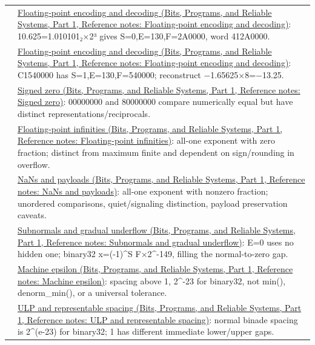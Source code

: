 {\begin{longtable}[]{@{}
  >{\raggedright\arraybackslash}p{}
  >{\raggedright\arraybackslash}p{}@{}}
67 & \href{../01-Bits-Programs-and-Reliable-Systems-P01/main.pdf\#nameddest=appendix-6854d0e2218e}{Floating-point encoding and decoding (Bits, Programs, and Reliable Systems, Part 1, Reference notes: Floating-point encoding and decoding)}: 10.625=1.010101₂×2³ gives S=0,E=130,F=2A0000, word 412A0000. \\
68 & \href{../01-Bits-Programs-and-Reliable-Systems-P01/main.pdf\#nameddest=appendix-6854d0e2218e}{Floating-point encoding and decoding (Bits, Programs, and Reliable Systems, Part 1, Reference notes: Floating-point encoding and decoding)}: C1540000 has S=1,E=130,F=540000; reconstruct −1.65625×8=−13.25. \\
69 & \href{../01-Bits-Programs-and-Reliable-Systems-P01/main.pdf\#nameddest=appendix-3a048f032c1f}{Signed zero (Bits, Programs, and Reliable Systems, Part 1, Reference notes: Signed zero)}: 00000000 and 80000000 compare numerically equal but have distinct representations/reciprocals. \\
70 & \href{../01-Bits-Programs-and-Reliable-Systems-P01/main.pdf\#nameddest=appendix-eb336149c00a}{Floating-point infinities (Bits, Programs, and Reliable Systems, Part 1, Reference notes: Floating-point infinities)}: all-one exponent with zero fraction; distinct from maximum finite and dependent on sign/rounding in overflow. \\
71 & \href{../01-Bits-Programs-and-Reliable-Systems-P01/main.pdf\#nameddest=appendix-d6607cc4c235}{NaNs and payloads (Bits, Programs, and Reliable Systems, Part 1, Reference notes: NaNs and payloads)}: all-one exponent with nonzero fraction; unordered comparisons, quiet/signaling distinction, payload preservation caveats. \\
72 & \href{../01-Bits-Programs-and-Reliable-Systems-P01/main.pdf\#nameddest=appendix-00a6e044c437}{Subnormals and gradual underflow (Bits, Programs, and Reliable Systems, Part 1, Reference notes: Subnormals and gradual underflow)}: E=0 uses no hidden one; binary32 x=(-1)\^{}S F×2\^{}-149, filling the normal-to-zero gap. \\
73 & \href{../01-Bits-Programs-and-Reliable-Systems-P01/main.pdf\#nameddest=appendix-390ea641da54}{Machine epsilon (Bits, Programs, and Reliable Systems, Part 1, Reference notes: Machine epsilon)}: spacing above 1, 2\^{}-23 for binary32, not min(), denorm\_min(), or a universal tolerance. \\
74 & \href{../01-Bits-Programs-and-Reliable-Systems-P01/main.pdf\#nameddest=appendix-14bab4cab9d4}{ULP and representable spacing (Bits, Programs, and Reliable Systems, Part 1, Reference notes: ULP and representable spacing)}: normal binade spacing is 2\^{}(e-23) for binary32; 1 has different immediate lower/upper gaps. \\

\end{longtable}}
